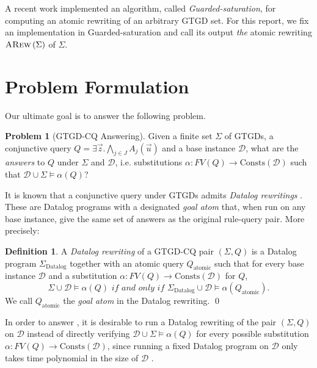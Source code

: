 \documentclass[12pt]{report}
\theoremstyle{plain}
\theoremstyle{definition}
\newtheorem{problem}[theorem]{Problem}
\newtheorem{definition}[theorem]{Definition}
\def\Consts{{\mathrm{Consts}}}
\newcommand{\ARew}[1]{\ensuremath{\normalfont{\textsc{ARew}} \left( #1 \right)}}
\begin{document}
A recent work \cite{benedikt_buron_germano_kappelmann_motik_2022} implemented an algorithm, called \emph{Guarded-saturation}, for computing an atomic rewriting of an arbitrary GTGD set. For this report, we fix an implementation in Guarded-saturation and call its output \emph{the} atomic rewriting $\ARew{\Sigma}$ of $\Sigma$.

\section{Problem Formulation}

Our ultimate goal is to answer the following problem.

\begin{problem}[GTGD-CQ Answering]
\label{GTGD-CQ-Answering}
  Given a finite set $\Sigma$ of GTGDs, a conjunctive query $Q = \exists \vec{z}. \bigwedge_{j \in J} A_j(\vec{u})$ and a base instance $\mathcal{D}$, what are the \emph{answers} to $Q$ under $\Sigma$ and $\mathcal{D}$, i.e. substitutions $\alpha: FV(Q) \rightarrow \Consts(\mathcal{D})$ such that $\mathcal{D} \cup \Sigma \models \alpha(Q)$?
\end{problem}

It is known that a conjunctive query under GTGDs admits \emph{Datalog rewritings} \cite{barany_benedikt_cate_2013}. These are Datalog programs with a designated \emph{goal atom} that, when run on any base instance, give the same set of answers as the original rule-query pair. More precisely:

\begin{definition}
  A \emph{Datalog rewriting} of a GTGD-CQ pair $(\Sigma, Q)$ is a Datalog program $\Sigma_\mathrm{Datalog}$ together with an atomic query $Q_\mathrm{atomic}$ such that for every base instance $\mathcal{D}$ and a substitution $\alpha: FV(Q) \rightarrow \Consts(\mathcal{D})$ for $Q$, $$\Sigma \cup \mathcal{D} \models \alpha(Q) \textit{ if and only if } \Sigma_\mathrm{Datalog} \cup \mathcal{D} \models \alpha(Q_\mathrm{atomic}).$$
  We call $Q_\mathrm{atomic}$ the \emph{goal atom} in the Datalog rewriting.
  \qed
\end{definition}

In order to answer , it is desirable to run a Datalog rewriting of the pair $(\Sigma, Q)$ on $\mathcal{D}$ instead of directly verifying $\mathcal{D} \cup \Sigma \models \alpha(Q)$ for every possible substitution $\alpha: FV(Q) \rightarrow \Consts(\mathcal{D})$, since running a fixed Datalog program on $\mathcal{D}$ only takes time polynomial in the size of $\mathcal{D}$ \cite{dantsin_eiter_gottlob_voronkov_2001}.
\end{document}
